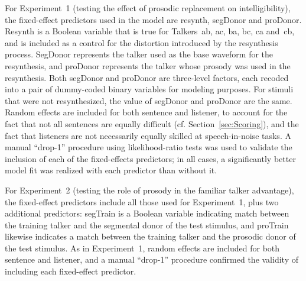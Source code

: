 For Experiment~1 (testing the effect of prosodic replacement on intelligibility), the fixed-effect predictors used in the model are {\inlinecode resynth}, {\inlinecode segDonor} and {\inlinecode proDonor}.  {\inlinecode Resynth} is a Boolean variable that is true for Talkers~\ac{ab}, \ac{ac}, \ac{ba}, \ac{bc}, \ac{ca} and~\ac{cb}, and is included as a control for the distortion introduced by the resynthesis process.  {\inlinecode SegDonor} represents the talker used as the base waveform for the resynthesis, and {\inlinecode proDonor} represents the talker whose prosody was used in the resynthesis.  Both {\inlinecode segDonor} and {\inlinecode proDonor} are three-level factors, each recoded into a pair of dummy-coded binary variables for modeling purposes.  For stimuli that were not resynthesized, the value of {\inlinecode segDonor} and {\inlinecode proDonor} are the same.  Random effects are included for both sentence and listener, to account for the fact that not all sentences are equally difficult (cf. Section~\ref{sec:Scoring}), and the fact that listeners are not necessarily equally skilled at speech-in-noise tasks.  A manual “drop-1” procedure using likelihood-ratio tests was used to validate the inclusion of each of the fixed-effects predictors; in all cases, a significantly better model fit was realized with each predictor than without it.

For Experiment~2 (testing the role of prosody in the familiar talker advantage), the fixed-effect predictors include all those used for Experiment~1, plus two additional predictors: {\inlinecode segTrain} is a Boolean variable indicating match between the training talker and the segmental donor of the test stimulus, and {\inlinecode proTrain} likewise indicates a match between the training talker and the prosodic donor of the test stimulus.  As in Experiment~1, random effects are included for both sentence and listener, and a manual “drop-1” procedure confirmed the validity of including each fixed-effect predictor.

